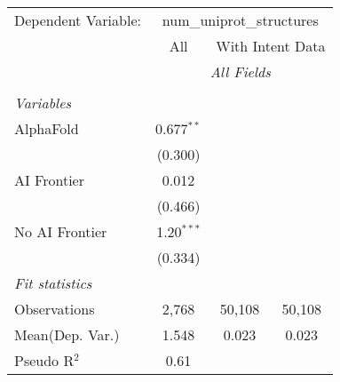 \begingroup
\centering
\begin{tabular}{lccc}
   \tabularnewline \midrule \midrule
   Dependent Variable: & \multicolumn{3}{c}{num\_uniprot\_structures}\\
 & \multicolumn{1}{c}{All} & \multicolumn{2}{c}{With Intent Data} \\
\cmidrule(lr){2-2} \cmidrule(lr){3-4}
 & \multicolumn{3}{c}{\textit{All Fields}} \\ \\
   \emph{Variables}\\
   AlphaFold      & 0.677$^{**}$ &        &   \\   
                  & (0.300)      &        &   \\   
   AI Frontier    & 0.012        &        &   \\   
                  & (0.466)      &        &   \\   
   No AI Frontier & 1.20$^{***}$ &        &   \\   
                  & (0.334)      &        &   \\   
   \midrule
   \emph{Fit statistics}\\
   Observations   & 2,768        & 50,108 & 50,108\\  
Mean(Dep. Var.) & 1.548 & 0.023 & 0.023 \\
   Pseudo R$^2$   & 0.61         &        & \\  
   

\end{tabular}
